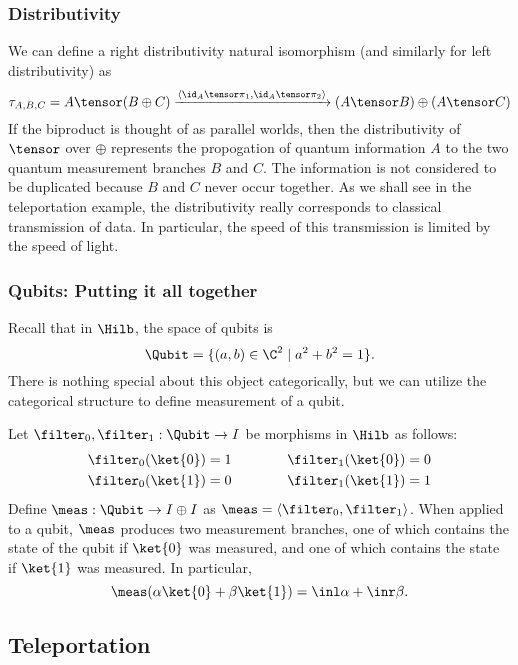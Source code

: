 \subsubsection*{Distributivity}
We can define a right distributivity natural isomorphism (and similarly for left distributivity)
as
\[
    \tau_{A,B,C} = A \tensor (B \oplus C)
    \xrightarrow{\langle \id_A \tensor \pi_1, \id_A \tensor \pi_2\rangle}
    (A \tensor B) \oplus (A \tensor C)
\]
If the biproduct is thought of as parallel worlds, then the distributivity of $\tensor$
over $\oplus$ represents the propogation of quantum information $A$ to the two
quantum measurement branches $B$ and $C$. The information is not considered to be duplicated
because $B$ and $C$ never occur together. As we shall see in the teleportation
example, the distributivity really corresponds to classical transmission of data.
In particular, the speed of this transmission is limited by the speed of light.

\subsubsection*{Qubits: Putting it all together}

Recall that in $\Hilb$, the space of qubits is
\[ \Qubit = \{(a,b) \in \C^2 \mid a^2 + b^2=1 \}. \]
There is nothing special about this object categorically, 
but we can utilize the categorical structure to define
measurement of a qubit.

Let $\filter_0,\filter_1 : \Qubit \rightarrow I$ be morphisms in $\Hilb$ as follows:
\begin{align*} \begin{aligned}
    \filter_0(\ket{0}) &= 1 \\
    \filter_0(\ket{1}) &= 0 
\end{aligned} \qquad\qquad \begin{aligned}
    \filter_1(\ket{0}) &= 0 \\
    \filter_1(\ket{1}) &= 1
\end{aligned} \end{align*}
Define $\meas : \Qubit \rightarrow I \oplus I$ as $\meas = \langle \filter_0, \filter_1 \rangle$.
When applied to a qubit, $\meas$ produces two measurement branches, one of which 
contains the state of the qubit if $\ket{0}$ was measured, and one of which contains
the state if $\ket{1}$ was measured. In particular,
\[ \meas(\alpha\ket{0} + \beta\ket{1}) = \inl \alpha + \inr \beta. \]

\subsection{Teleportation}

